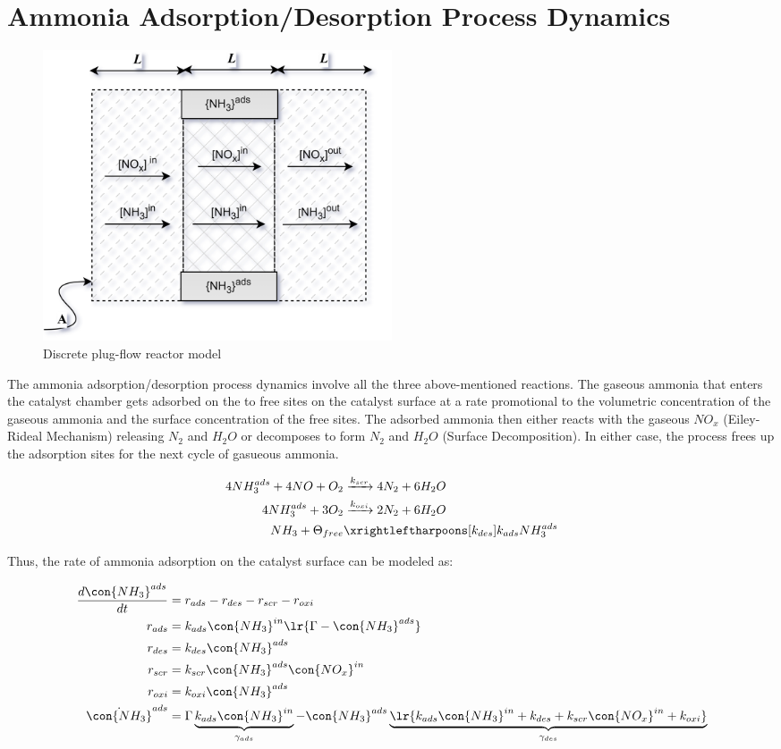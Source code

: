 \newpage
\section{Ammonia Adsorption/Desorption Process Dynamics}

\begin{figure}[H]
    \centering
    \includegraphics[width=0.5\textwidth]{./figs/scr_sys/plug_flow_discrete.png}
    \caption{Discrete plug-flow reactor model}
    \label{fig:plug_flow_discrete}
\end{figure}


The ammonia adsorption/desorption process dynamics involve all the three
above-mentioned reactions. The gaseous ammonia that enters the catalyst chamber
gets adsorbed on the to free sites on the catalyst surface at a rate
promotional to the volumetric concentration of the gaseous ammonia and the
surface concentration of the free sites. The adsorbed ammonia then either reacts
with the gaseous $NO_x$ (Eiley-Rideal Mechanism) releasing $N_2$ and $H_2O$ or
decomposes to form $N_2$ and $H_2O$ (Surface Decomposition). In either
case, the process frees up the adsorption sites for the next cycle of gasueous ammonia.

\begin{align*}
    4 NH_3 ^{ads} + 4 NO + O_2 &\xrightarrow[]{k_{scr}} 4 N_2 + 6 H_2O \\
    4 NH_3^{ads} + 3 O_2 &\xrightarrow[]{k_{oxi}} 2 N_2 + 6 H_2O \\
    NH_3 + \Theta_{free} &\xrightleftharpoons[k_{des}]{k_{ads}} NH_3^{ads}
\end{align*}


Thus, the rate of ammonia adsorption on the catalyst surface can be modeled as:

\begin{align*}
    \frac{d \con{NH_3}^{ads}}{dt} &= r_{ads} - r_{des} - r_{scr} - r_{oxi}\\
    r_{ads} &= k_{ads} \con{NH_3}^{in} \lr{\Gamma - \con{NH_3}^{ads}}\\
    r_{des} &= k_{des} \con{NH_3}^{ads}\\
    r_{scr} &= k_{scr} \con{NH_3}^{ads} \con{NO_x}^{in}\\
    r_{oxi} &= k_{oxi} \con{NH_3}^{ads}\\
    \dot{\con{NH_3}}^{ads} &= \Gamma \underbrace{k_{ads} \con{NH_3}^{in}}_{\gamma_{ads}} - \con{NH_3}^{ads} \underbrace{\lr{k_{ads} \con{NH_3}^{in} + k_{des} + k_{scr} \con{NO_x}^{in} + k_{oxi}}}_{\gamma_{des}}
\end{align*}

